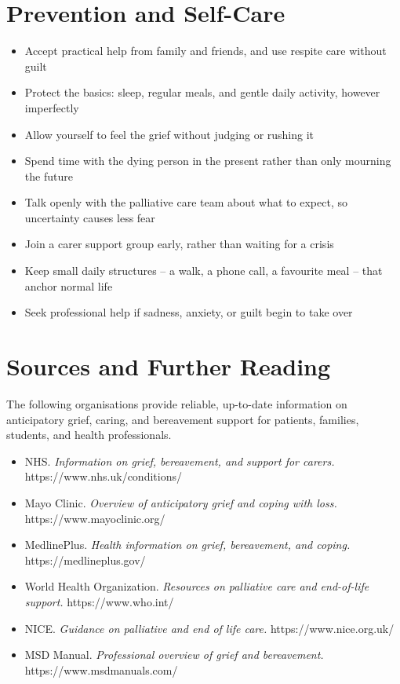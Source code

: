 \section*{Prevention and Self-Care}
\begin{itemize}
    \item Accept practical help from family and friends, and use respite care without guilt
    \item Protect the basics: sleep, regular meals, and gentle daily activity, however imperfectly
    \item Allow yourself to feel the grief without judging or rushing it
    \item Spend time with the dying person in the present rather than only mourning the future
    \item Talk openly with the palliative care team about what to expect, so uncertainty causes less fear
    \item Join a carer support group early, rather than waiting for a crisis
    \item Keep small daily structures -- a walk, a phone call, a favourite meal -- that anchor normal life
    \item Seek professional help if sadness, anxiety, or guilt begin to take over
\end{itemize}

\section*{Sources and Further Reading}
The following organisations provide reliable, up-to-date information on anticipatory grief, caring, and bereavement support for patients, families, students, and health professionals.

\begin{itemize}
    \item NHS. \textit{Information on grief, bereavement, and support for carers.} https://www.nhs.uk/conditions/
    \item Mayo Clinic. \textit{Overview of anticipatory grief and coping with loss.} https://www.mayoclinic.org/
    \item MedlinePlus. \textit{Health information on grief, bereavement, and coping.} https://medlineplus.gov/
    \item World Health Organization. \textit{Resources on palliative care and end-of-life support.} https://www.who.int/
    \item NICE. \textit{Guidance on palliative and end of life care.} https://www.nice.org.uk/
    \item MSD Manual. \textit{Professional overview of grief and bereavement.} https://www.msdmanuals.com/
\end{itemize}
